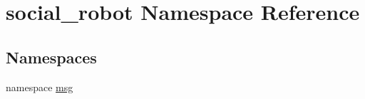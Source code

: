 \hypertarget{namespacesocial__robot}{\section{social\-\_\-robot Namespace Reference}
\label{namespacesocial__robot}
}
\subsection*{Namespaces}
\begin{DoxyCompactItemize}
\item 
namespace \hyperlink{namespacesocial__robot_1_1msg}{msg}
\end{DoxyCompactItemize}
